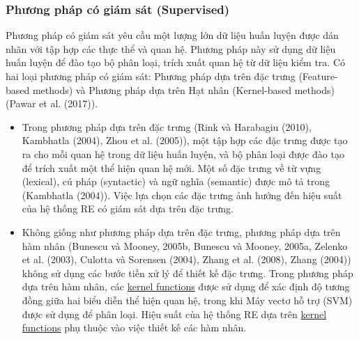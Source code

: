 \subsubsection{Phương pháp có giám sát (Supervised)}
Phương pháp có giám sát yêu cầu một lượng lớn dữ liệu huấn luyện được dán nhãn với tập hợp các thực thể và quan hệ. Phương pháp này sử dụng dữ liệu huấn luyện để đào tạo bộ phân loại, trích xuất quan hệ từ dữ liệu kiểm tra. Có hai loại phương pháp có giám sát: Phương pháp dựa trên đặc trưng (Feature-based methods) và Phương pháp dựa trên Hạt nhân (Kernel-based methods) (Pawar et al. (2017)).
\begin{itemize}
    \item
        Trong phương pháp dựa trên đặc trưng (Rink và Harabagiu (2010), Kambhatla (2004), Zhou et al. (2005)),
        một tập hợp các đặc trưng được tạo ra cho mỗi quan hệ trong dữ liệu huấn luyện, và bộ phân loại được đào
        tạo để trích xuất một thể hiện quan hệ mới. Một số đặc trưng về từ vựng (lexical), cú pháp (syntactic)
        và ngữ nghĩa (semantic) được mô tả trong (Kambhatla (2004)). Việc lựa chọn các đặc trưng ảnh hưởng đến hiệu
        suất của hệ thống RE có giám sát dựa trên đặc trưng.
    \item
        Không giống như phương pháp dựa trên đặc trưng, phương pháp dựa trên hàm nhân (Bunescu và Mooney, 2005b,
        Bunescu và Mooney, 2005a, Zelenko et al. (2003), Culotta và Sorensen (2004), Zhang et al. (2008),
        Zhang (2004)) không sử dụng các bước tiền xử lý để thiết kế đặc trưng. Trong phương pháp dựa trên hàm nhân,
        các \href{https://www.sciencedirect.com/topics/computer-science/kernel-function}{kernel functions} được sử dụng để xác định độ tương đồng giữa hai biểu diễn thể hiện quan hệ, trong khi Máy vectơ
        hỗ trợ (SVM) được sử dụng để phân loại. Hiệu suất của hệ thống RE dựa trên \href{https://www.sciencedirect.com/topics/computer-science/kernel-function}{kernel functions} phụ thuộc vào việc thiết
        kế các hàm nhân.

\end{itemize}


